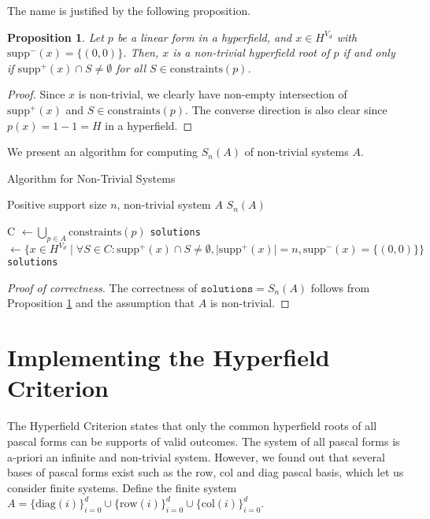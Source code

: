 \documentclass[11pt]{article}
\newtheorem{proposition}[theorem]{Proposition}
\begin{document}
The name is justified by the following proposition.

\begin{proposition}\label{prop:hyperfield_criterion:constraints}
  Let $p$ be a linear form in a hyperfield, and $x \in H^{V_{d}}$ with $\mathrm{supp}^-(x) = \{ (0,0) \}$. Then, $x$ is a non-trivial hyperfield root of $p$ if and only if $\mathrm{supp}^+(x) \cap S \neq \emptyset$ for all $S \in \mathrm{constraints}(p)$. 
\end{proposition}

\begin{proof}
  Since $x$ is non-trivial, we clearly have non-empty intersection of $\mathrm{supp}^+(x)$ and $S \in \mathrm{constraints}(p)$. The converse direction is also clear since $p(x) = 1 - 1 = H$ in a hyperfield.
\end{proof}

We present an algorithm for computing $S_{n}(A)$ of non-trivial systems $A$.

\begin{algorithm}
\caption{Algorithm for Non-Trivial Systems}\label{alg:hyperfield_criterion:efficient}
  \begin{algorithmic}[1]
    \Require Positive support size $n$, non-trivial system $A$ 
    \Ensure $S_{n}(A)$

      \State C $\gets \bigcup_{p \in A}\mathrm{constraints}(p)$
      \State \texttt{solutions} $\gets \{ x \in H^{V_{d}} \mid \forall S \in C: \mathrm{supp}^+(x) \cap S \neq \emptyset, \vert \mathrm{supp}^+(x) \vert = n,  \mathrm{supp}^-(x) = \{(0,0)\}   \}$
      \State \Return \texttt{solutions}
    \EndFunction
  \end{algorithmic}  
\end{algorithm}

\begin{proof}[Proof of correctness]
  The correctness of $\texttt{solutions} = S_{n}(A)$ follows from Proposition \ref{prop:hyperfield_criterion:constraints} and the assumption that $A$ is non-trivial. 
\end{proof}

\section{Implementing the Hyperfield Criterion}

The Hyperfield Criterion states that only the common hyperfield roots of all pascal forms can be supports of valid outcomes. The system of all pascal forms is a-priori an infinite and non-trivial system. However, we found out that several bases of pascal forms exist such as the row, col and diag pascal basis, which let us consider finite systems. Define the finite system $A = \{ \mathrm{diag}(i) \}_{i=0}^d \cup \{ \mathrm{row}(i)\}^d_{i=0} \cup \{ \mathrm{col}(i) \}^d_{i=0}$.
\end{document}
